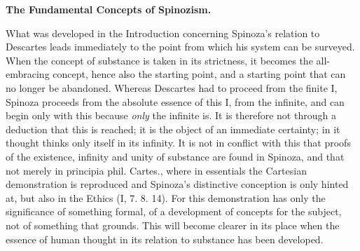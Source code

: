 \documentclass[12pt,a4paper,openany]{book}
\newcommand{\opage}[1]{\marginnote{\footnotesize\textit{[#1]}}}
\begin{document}
\begin{center}
\textbf{The Fundamental Concepts of Spinozism.}
\end{center}

\opage{44} What was developed in the Introduction concerning Spinoza's relation to
Descartes leads immediately to the point from which his system can be
surveyed. When the concept of substance is taken in its strictness, it becomes
the all-embracing concept, hence also the starting point, and a
starting point that can no longer be abandoned. Whereas Descartes had to proceed
from the finite I, Spinoza proceeds from the absolute
essence of this I, from the infinite, and can begin only with this because \emph{only} the
infinite is. It is therefore not through a deduction that this is reached;
it is the object of an immediate certainty; in it thought thinks only itself
in its infinity. It is not in conflict with this that proofs of the existence,
infinity and unity of substance are found in Spinoza, and
that not merely in principia phil. Cartes., where in essentials the
Cartesian demonstration is reproduced and Spinoza's distinctive conception
is only hinted at, but also in the Ethics (I, 7. 8. 14). For this demonstration
has only the significance of something formal, of a development of concepts for
the subject, not of something that grounds. This will become clearer in its place
when the essence of human thought in its relation to
substance has been developed.
\end{document}
